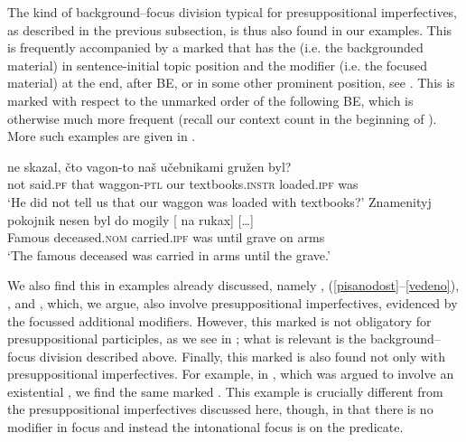 \documentclass[output=paper,modfonts,newtxmath,hidelinks
\ChapterDOI{10.5281/zenodo.2545513}
]{langscibook}
\begin{document}
\noindent The kind of background--focus division typical for presuppositional imperfectives, as described in the previous subsection, is thus also found in our examples. This  is frequently accompanied by a marked  that has the  (i.e. the backgrounded material) in sentence-initial topic position and the modifier (i.e. the focused material) at the end, after BE, or in some other prominent position, see . This  is marked with respect to the unmarked order of the  following BE, which is otherwise much more frequent (recall our context count in the beginning of ). More such examples are given in .

\ea\label{presOF-WO}
\ea\gll	[...] ne skazal, čto vagon-to naš učebnikami gružen byl?\\
	{} not said.\textsc{pf} that waggon-\textsc{ptl} our textbooks.\textsc{instr} loaded.\textsc{ipf} was\\
\glt	`He did not tell us that our waggon was loaded with textbooks?'\label{textbooks}
\ex\gll Znamenityj pokojnik nesen byl do mogily {\hspace{60pt}} [\hspace{-2pt} na rukax] [\dots] \label{nesen} \\
	Famous deceased.\textsc{nom} carried.\textsc{ipf} was until grave {} {} on arms\\
\glt	`The famous deceased was carried in arms until the grave.'
\z\z

\noindent We also find this  in examples already discussed, namely , (\ref{pisanodost}--\ref{vedeno}), , and , which, we argue, also involve presuppositional imperfectives, evidenced by the focussed additional modifiers. However, this marked  is not obligatory for presuppositional  participles, as we see in ; what is relevant is the background--focus division described above. Finally, this marked  is also found not only with presuppositional imperfectives. For example, in , which was argued to involve an existential , we find the same marked . This example is crucially different from the presuppositional imperfectives discussed here, though, in that there is no modifier in focus and instead the intonational focus is on the predicate.
\end{document}
